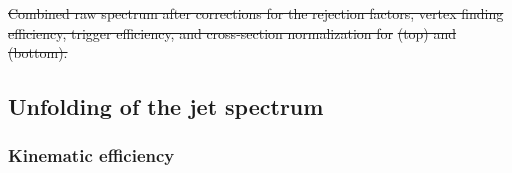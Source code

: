 \documentclass[ALICE]{ALICE_analysis_notes}
\newcommand{\pPb}{{\mbox{p--Pb}}\xspace}
\newcommand{\pp}{pp\xspace}
\providecommand{\DIFaddtex}[1]{{\protect\color{blue}\uwave{#1}}} %
\providecommand{\DIFdeltex}[1]{{\protect\color{red}\sout{#1}}}                      %
\providecommand{\DIFaddbegin}{} %
\providecommand{\DIFaddend}{} %
\providecommand{\DIFdelbegin}{} %
\providecommand{\DIFdelend}{} %
\providecommand{\DIFdelFL}[1]{\DIFdel{#1}} %
\providecommand{\DIFadd}[1]{\texorpdfstring{\DIFaddtex{#1}}{#1}} %
\providecommand{\DIFdel}[1]{\texorpdfstring{\DIFdeltex{#1}}{}} %
\newcommand{\DIFscaledelfig}{0.5}
\newlength{\DIFdelgraphicswidth} %
\newlength{\DIFdelgraphicsheight} %
\newcommand{\DIFaddincludegraphics}[2][]{{\color{blue}\fbox{\DIFOincludegraphics[#1]{#2}}}} %
\newcommand{\DIFdelincludegraphics}[2][]{%
\sbox{\DIFdelgraphicsbox}{\DIFOincludegraphics[#1]{#2}}%
\settoboxwidth{\DIFdelgraphicswidth}{\DIFdelgraphicsbox} %
\settoboxtotalheight{\DIFdelgraphicsheight}{\DIFdelgraphicsbox} %
\scalebox{\DIFscaledelfig}{%
\parbox[b]{\DIFdelgraphicswidth}{\usebox{\DIFdelgraphicsbox}\\[-\baselineskip] \rule{\DIFdelgraphicswidth}{0em}}\llap{\resizebox{\DIFdelgraphicswidth}{\DIFdelgraphicsheight}{%
\setlength{\unitlength}{\DIFdelgraphicswidth}%
\begin{picture}(1,1)%
\thicklines\linethickness{2pt} %
{\color[rgb]{1,0,0}\put(0,0){\framebox(1,1){}}}%
{\color[rgb]{1,0,0}\put(0,0){\line( 1,1){1}}}%
{\color[rgb]{1,0,0}\put(0,1){\line(1,-1){1}}}%
\end{picture}%
}\hspace*{3pt}}} %
} %
\DeclareRobustCommand{\DIFaddbegin}{\DIFOaddbegin \let\includegraphics\DIFaddincludegraphics} %
\DeclareRobustCommand{\DIFaddend}{\DIFOaddend \let\includegraphics\DIFOincludegraphics} %
\DeclareRobustCommand{\DIFdelbegin}{\DIFOdelbegin \let\includegraphics\DIFdelincludegraphics} %
\DeclareRobustCommand{\DIFdelend}{\DIFOaddend \let\includegraphics\DIFOincludegraphics} %
\begin{document}
\DIFdelbegin %
{%
\DIFdelFL{Combined raw spectrum after corrections for the rejection factors, vertex finding efficiency, trigger efficiency, and cross-section normalization for }%
\DIFdelFL{(top) and }%
\DIFdelFL{(bottom).}}
\DIFdelend \DIFaddbegin \DIFadd{\textcolor{red}{I edited out a figure here. Make sure stuff lines up}
}\DIFaddend 

\subsection{Unfolding of the jet spectrum}
\label{sec:unfolding}
\subsubsection{Kinematic efficiency}
\label{subsec:kinEff}
\end{document}
